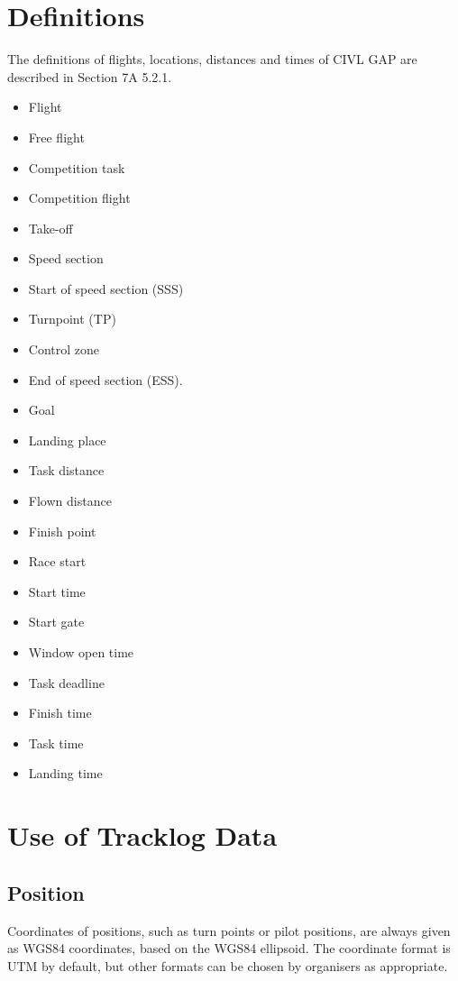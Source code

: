 \documentclass{article}
\begin{document}
\section{Definitions}
The definitions of flights, locations, distances and times of CIVL GAP are
described in Section 7A 5.2.1.
\begin{itemize}
    \item Flight
    \item Free flight
    \item Competition task
    \item Competition flight
    \item Take-off
    \item Speed section
    \item Start of speed section (SSS)
    \item Turnpoint (TP)
    \item Control zone
    \item End of speed section (ESS).
    \item Goal
    \item Landing place
    \item Task distance
    \item Flown distance
    \item Finish point
    \item Race start
    \item Start time
    \item Start gate
    \item Window open time
    \item Task deadline
    \item Finish time
    \item Task time
    \item Landing time
\end{itemize}


\newpage
\section{Use of Tracklog Data}
\label{sec:use-of-tracklog-data}
\subsection{Position}
Coordinates of positions, such as turn points or pilot positions, are always
given as WGS84 coordinates, based on the WGS84 ellipsoid. The coordinate format
is UTM by default, but other formats can be chosen by organisers as
appropriate.
\end{document}
